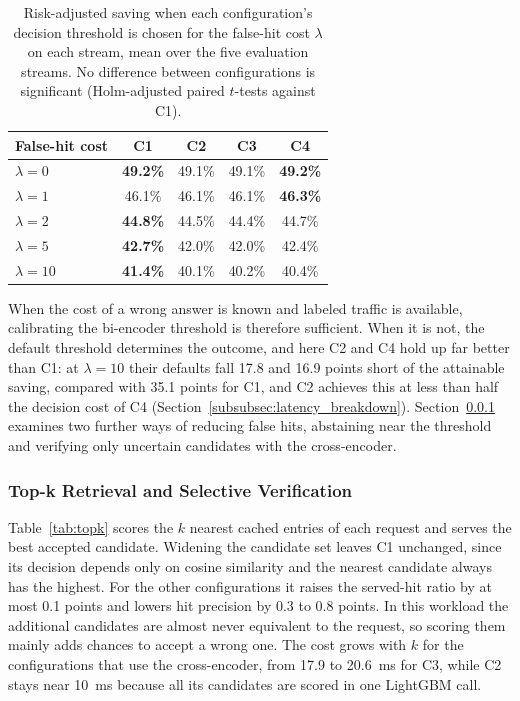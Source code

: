 \documentclass[authoryear,preprint,review,12pt]{elsarticle}
\begin{document}
\begin{table}[htbp]
\centering
\caption{Risk-adjusted saving when each configuration's decision threshold is chosen for the false-hit cost $\lambda$ on each stream, mean over the five evaluation streams. No difference between configurations is significant (Holm-adjusted paired $t$-tests against C1).}
\label{tab:best_per_lambda}
\footnotesize
\begin{tabular}{lcccc}
\toprule
False-hit cost & C1 & C2 & C3 & C4 \\
\midrule
$\lambda=0$ & \textbf{49.2\%} & 49.1\% & 49.1\% & \textbf{49.2\%} \\
$\lambda=1$ & 46.1\% & 46.1\% & 46.1\% & \textbf{46.3\%} \\
$\lambda=2$ & \textbf{44.8\%} & 44.5\% & 44.4\% & 44.7\% \\
$\lambda=5$ & \textbf{42.7\%} & 42.0\% & 42.0\% & 42.4\% \\
$\lambda=10$ & \textbf{41.4\%} & 40.1\% & 40.2\% & 40.4\% \\
\bottomrule
\end{tabular}
\end{table}

When the cost of a wrong answer is known and labeled traffic is available, calibrating the bi-encoder threshold is therefore sufficient. When it is not, the default threshold determines the outcome, and here C2 and C4 hold up far better than C1: at $\lambda=10$ their defaults fall 17.8 and 16.9 points short of the attainable saving, compared with 35.1 points for C1, and C2 achieves this at less than half the decision cost of C4 (Section~\ref{subsubsec:latency_breakdown}). Section~\ref{subsec:topk_gating} examines two further ways of reducing false hits, abstaining near the threshold and verifying only uncertain candidates with the cross-encoder.

\subsubsection{Top-k Retrieval and Selective Verification}
\label{subsec:topk_gating}
Table~\ref{tab:topk} scores the $k$ nearest cached entries of each request and serves the best accepted candidate. Widening the candidate set leaves C1 unchanged, since its decision depends only on cosine similarity and the nearest candidate always has the highest. For the other configurations it raises the served-hit ratio by at most 0.1 points and lowers hit precision by 0.3 to 0.8 points. In this workload the additional candidates are almost never equivalent to the request, so scoring them mainly adds chances to accept a wrong one. The cost grows with $k$ for the configurations that use the cross-encoder, from 17.9 to 20.6~ms for C3, while C2 stays near 10~ms because all its candidates are scored in one LightGBM call.
\end{document}
